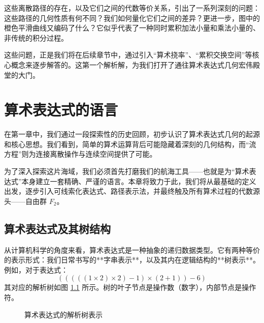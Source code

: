 \documentclass[a4paper,12pt]{book}
\numberwithin{problem}{section}
\numberwithin{definition}{section}
\numberwithin{lemma}{section}
\numberwithin{proposition}{section}
\numberwithin{theorem}{section}
\numberwithin{grammar}{section}
\numberwithin{program}{section}
\numberwithin{convention}{section}
\numberwithin{corollary}{section}
\begin{document}
这些离散路径的存在，以及它们之间的代数等价关系，引出了一系列深刻的问题：这些路径的几何性质有何不同？我们如何量化它们之间的差异？更进一步，图中的橙色平滑曲线又编码了什么？它似乎代表了一种同时累积加法小量和乘法小量的、非传统的积分过程。

这些问题，正是我们将在后续章节中，通过引入“算术挠率”、“累积交换空间”等核心概念来逐步解答的。这第一个解析解，为我们打开了通往算术表达式几何宏伟殿堂的大门。
\newpage


\chapter{算术表达式的语言}
\label{chap:language_of_aeg}

在第一章中，我们通过一段探索性的历史回顾，初步认识了算术表达式几何的起源和核心思想。我们看到，简单的算术运算背后可能隐藏着深刻的几何结构，而“流方程”则为连接离散操作与连续空间提供了可能。

为了深入探索这片海域，我们必须首先打磨我们的航海工具——也就是为“算术表达式”本身建立一套精确、严谨的语言。本章将致力于此，我们将从最基础的定义出发，逐步引入可线索化表达式、路径表示法，并最终触及所有算术过程的代数源头——自由群 $F_2$。

\section{算术表达式及其树结构}
\label{sec:arithmetic_expression}

从计算机科学的角度来看，算术表达式是一种抽象的递归数据类型。它有两种等价的表示形式：我们日常书写的**字串表示**，以及其内在逻辑结构的**树表示**。例如，对于表达式：
\begin{equation}
    (((((1 \times 2) \times 2) - 1) \times (2 + 1)) - 6)
\end{equation}
其对应的解析树如图 \ref{fig:syntaxtree_ch2} 所示。树的叶子节点是操作数（数字），内部节点是操作符。

\begin{figure}[ht]
    \centering
    \caption{算术表达式的解析树表示}
    \label{fig:syntaxtree_ch2}
\end{figure}
\end{document}
